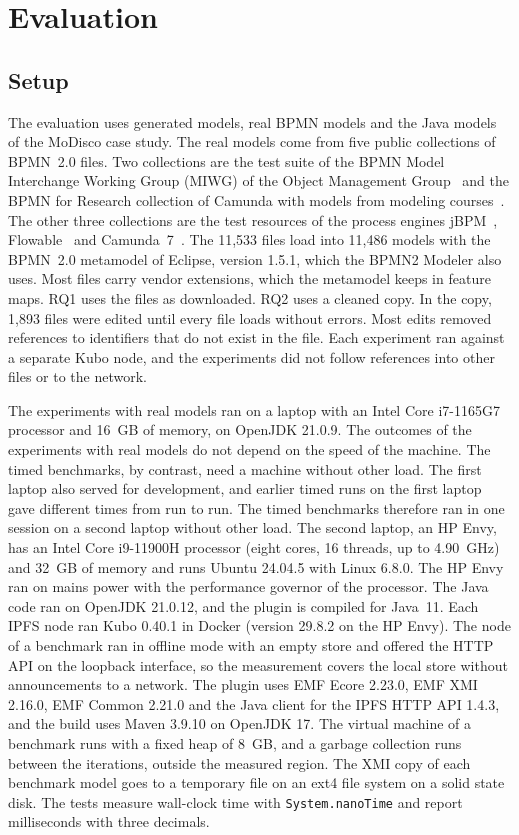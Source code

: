 \documentclass[5p,times,twocolumn]{elsarticle}
\theoremstyle{definition}
\theoremstyle{plain}
\begin{document}
\section{Evaluation}\label{sec:evaluation}

\subsection{Setup}\label{sec:evaluation-setup}

The evaluation uses generated models, real BPMN models and the Java models of the MoDisco case study. The real models come from five public collections of BPMN~2.0 files. Two collections are the test suite of the BPMN Model Interchange Working Group (MIWG) of the Object Management Group~\cite{miwgtestsuite} and the BPMN for Research collection of Camunda with models from modeling courses~\cite{camundabpmnresearch}. The other three collections are the test resources of the process engines jBPM~\cite{jbpmrepository}, Flowable~\cite{flowablerepository} and Camunda~7~\cite{camunda7repository}. The 11,533 files load into 11,486 models with the BPMN~2.0 metamodel of Eclipse, version 1.5.1, which the BPMN2 Modeler also uses. Most files carry vendor extensions, which the metamodel keeps in feature maps. RQ1 uses the files as downloaded. RQ2 uses a cleaned copy. In the copy, 1,893 files were edited until every file loads without errors. Most edits removed references to identifiers that do not exist in the file. Each experiment ran against a separate Kubo node, and the experiments did not follow references into other files or to the network.

The experiments with real models ran on a laptop with an Intel Core i7-1165G7 processor and 16~GB of memory, on OpenJDK 21.0.9. The outcomes of the experiments with real models do not depend on the speed of the machine. The timed benchmarks, by contrast, need a machine without other load. The first laptop also served for development, and earlier timed runs on the first laptop gave different times from run to run. The timed benchmarks therefore ran in one session on a second laptop without other load. The second laptop, an HP Envy, has an Intel Core i9-11900H processor (eight cores, 16 threads, up to 4.90~GHz) and 32~GB of memory and runs Ubuntu 24.04.5 with Linux 6.8.0. The HP Envy ran on mains power with the performance governor of the processor. The Java code ran on OpenJDK 21.0.12, and the plugin is compiled for Java~11. Each IPFS node ran Kubo 0.40.1 in Docker (version 29.8.2 on the HP Envy). The node of a benchmark ran in offline mode with an empty store and offered the HTTP API on the loopback interface, so the measurement covers the local store without announcements to a network. The plugin uses EMF Ecore 2.23.0, EMF XMI 2.16.0, EMF Common 2.21.0 and the Java client for the IPFS HTTP API 1.4.3, and the build uses Maven 3.9.10 on OpenJDK 17. The virtual machine of a benchmark runs with a fixed heap of 8~GB, and a garbage collection runs between the iterations, outside the measured region. The XMI copy of each benchmark model goes to a temporary file on an ext4 file system on a solid state disk. The tests measure wall-clock time with \texttt{System.nanoTime} and report milliseconds with three decimals.
\end{document}
